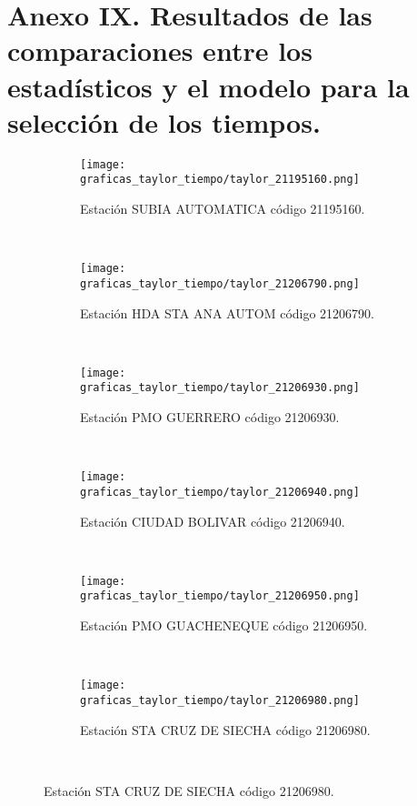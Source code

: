 \appendix

\chapter{Anexo IX. Resultados de las comparaciones entre los estadísticos y el modelo para la selección de los tiempos.}
\begin{figure}
    \centering

\begin{subfigure}[normla]{0.4\textwidth}
\texttt{[image: graficas\_taylor\_tiempo/taylor\_21195160.png]}
\caption{Estación SUBIA AUTOMATICA  código 21195160.}
\end{subfigure}
~
\begin{subfigure}[normla]{0.4\textwidth}
\texttt{[image: graficas\_taylor\_tiempo/taylor\_21206790.png]}
\caption{Estación HDA STA ANA AUTOM  código 21206790.}
\end{subfigure}
~
\begin{subfigure}[normla]{0.4\textwidth}
\texttt{[image: graficas\_taylor\_tiempo/taylor\_21206930.png]}
\caption{Estación PMO GUERRERO  código 21206930.}
\end{subfigure}
~
\begin{subfigure}[normla]{0.4\textwidth}
\texttt{[image: graficas\_taylor\_tiempo/taylor\_21206940.png]}
\caption{Estación CIUDAD BOLIVAR  código 21206940.}
\end{subfigure}
~
\begin{subfigure}[normla]{0.4\textwidth}
\texttt{[image: graficas\_taylor\_tiempo/taylor\_21206950.png]}
\caption{Estación PMO GUACHENEQUE  código 21206950.}
\end{subfigure}
~
\begin{subfigure}[normla]{0.4\textwidth}
\texttt{[image: graficas\_taylor\_tiempo/taylor\_21206980.png]}
\caption{Estación STA CRUZ DE SIECHA  código 21206980.}
\end{subfigure}
~
\end{figure}
           
